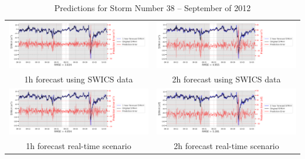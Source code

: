\documentclass[draft,sw]{agutexSI2019}
\begin{document}
\begin{table}
\centering
\begin{tabular}{cc}
\includegraphics[width=0.49\linewidth]{paper_plots_shade/1h_swics/1h_swics_storm_38.png}
&
\includegraphics[width=0.49\linewidth]{paper_plots_shade/2h_swics/2h_swics_storm_38.png}
\\
1h forecast using SWICS data & 2h forecast using SWICS data
\vspace*{12pt}
\\
\includegraphics[width=0.49\linewidth]{paper_plots_shade/1h_rt/1h_rt_storm_38.png}
&
\includegraphics[width=0.49\linewidth]{paper_plots_shade/2h_rt/2h_rt_storm_38.png}
\\
1h forecast real-time scenario & 2h forecast real-time scenario 
\vspace*{12pt}
\\
\end{tabular}
\caption{Predictions for Storm Number 38 -- September of 2012}
\label{storm-38}
\end{table}
\end{document}
